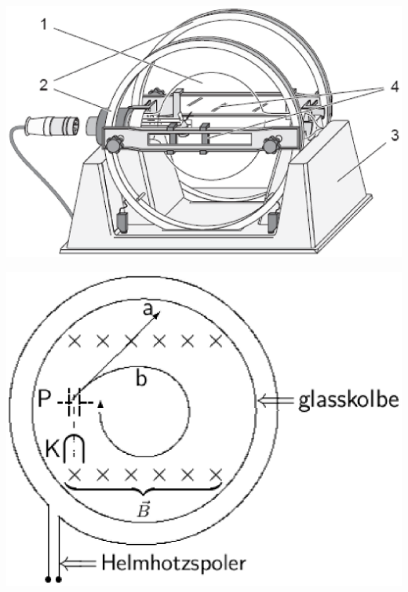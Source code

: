 \documentclass[../Elmag-labhefte-2020.tex]{subfiles}
\begin{document}
\begin{marginfigure}%
  \centering
  \includegraphics[scale=0.525]{fig/FineBeamApparat.eps}
  \caption{%
    The Leybold apparatus with the electron canon inside a glass vessel (1).
    Helmholtz coils (2), holder (3), and radius measuring device (4). 
  }
  \label{lorentz.fig4}
  \vspace{0.5cm}
\end{marginfigure}
\begin{marginfigure}
  \centering
  \includegraphics[scale=0.525]{fig/Schematic.eps}
  \caption{%
  Schematic drawing.
  The electron canon (K), deflection of the electron beam between the deflection plates (P).
  The magnetic field is indicated with crosses, $\times$, into the paper and the electron beam is shown without (a) and with (b) the $B$-field.}
  \label{lorentz.fig5}
\end{marginfigure}
\end{document}
